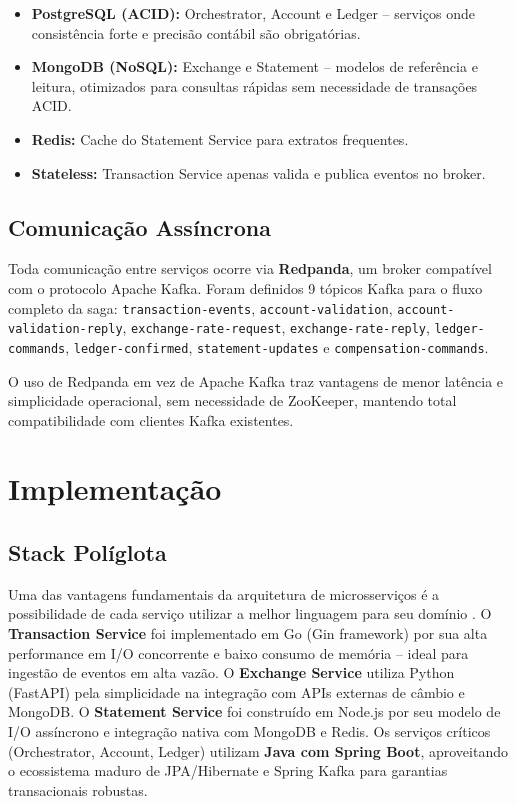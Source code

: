 \documentclass[12pt]{article}
\begin{document}
\begin{itemize}[noitemsep]
  \item \textbf{PostgreSQL (ACID):} Orchestrator, Account e Ledger -- servi\c{c}os onde consist\^{e}ncia forte e precis\~{a}o cont\'{a}bil s\~{a}o obrigat\'{o}rias.
  \item \textbf{MongoDB (NoSQL):} Exchange e Statement -- modelos de refer\^{e}ncia e leitura, otimizados para consultas r\'{a}pidas sem necessidade de transa\c{c}\~{o}es ACID.
  \item \textbf{Redis:} Cache do Statement Service para extratos frequentes.
  \item \textbf{Stateless:} Transaction Service apenas valida e publica eventos no broker.
\end{itemize}

\subsection{Comunica\c{c}\~{a}o Ass\'{i}ncrona}

Toda comunica\c{c}\~{a}o entre servi\c{c}os ocorre via \textbf{Redpanda}, um broker compat\'{i}vel com o protocolo Apache Kafka. Foram definidos 9 t\'{o}picos Kafka para o fluxo completo da saga: \texttt{transaction-events}, \texttt{account-validation}, \texttt{account-validation-reply}, \texttt{exchange-rate-request}, \texttt{exchange-rate-reply}, \texttt{ledger-commands}, \texttt{ledger-confirmed}, \texttt{statement-updates} e \texttt{compensation-commands}.

O uso de Redpanda em vez de Apache Kafka traz vantagens de menor lat\^{e}ncia e simplicidade operacional, sem necessidade de ZooKeeper, mantendo total compatibilidade com clientes Kafka existentes.


\section{Implementa\c{c}\~{a}o}

\subsection{Stack Pol\'{i}glota}

Uma das vantagens fundamentais da arquitetura de microsservi\c{c}os \'{e} a possibilidade de cada servi\c{c}o utilizar a melhor linguagem para seu dom\'{i}nio \cite{newman2015}. O \textbf{Transaction Service} foi implementado em Go (Gin framework) por sua alta performance em I/O concorrente e baixo consumo de mem\'{o}ria -- ideal para ingest\~{a}o de eventos em alta vaz\~{a}o. O \textbf{Exchange Service} utiliza Python (FastAPI) pela simplicidade na integra\c{c}\~{a}o com APIs externas de c\^{a}mbio e MongoDB. O \textbf{Statement Service} foi constru\'{i}do em Node.js por seu modelo de I/O ass\'{i}ncrono e integra\c{c}\~{a}o nativa com MongoDB e Redis. Os servi\c{c}os cr\'{i}ticos (Orchestrator, Account, Ledger) utilizam \textbf{Java com Spring Boot}, aproveitando o ecossistema maduro de JPA/Hibernate e Spring Kafka para garantias transacionais robustas.
\end{document}
